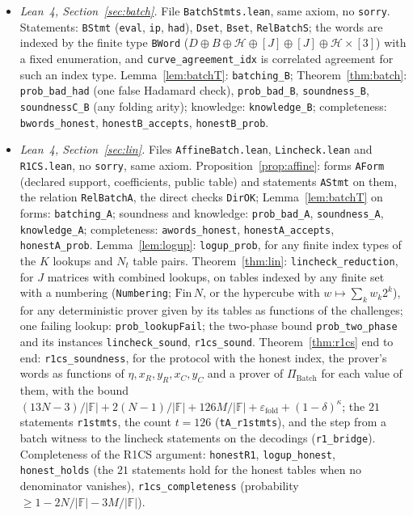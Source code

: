 \documentclass[11pt]{article}
\theoremstyle{definition}
\newcommand{\F}{\mathbb{F}}
\begin{document}
\begin{itemize}[nosep]
\item \emph{Lean~4, Section~\ref{sec:batch}.} File \texttt{BatchStmts.lean}, same axiom, no \texttt{sorry}. Statements: \texttt{BStmt} (\texttt{eval}, \texttt{ip}, \texttt{had}), \texttt{Dset}, \texttt{Bset}, \texttt{RelBatchS}; the words are indexed by the finite type \texttt{BWord} ($D\oplus B\oplus\mathcal H\oplus[J]\oplus[J]\oplus\mathcal H\times[3]$) with a fixed enumeration, and \texttt{curve\_agreement\_idx} is correlated agreement for such an index type. Lemma~\ref{lem:batchT}: \texttt{batching\_B}; Theorem~\ref{thm:batch}: \texttt{prob\_bad\_had} (one false Hadamard check), \texttt{prob\_bad\_B}, \texttt{soundness\_B}, \texttt{soundnessC\_B} (any folding arity); knowledge: \texttt{knowledge\_B}; completeness: \texttt{bwords\_honest}, \texttt{honestB\_accepts}, \texttt{honestB\_prob}.
\item \emph{Lean~4, Section~\ref{sec:lin}.} Files \texttt{AffineBatch.lean}, \texttt{Lincheck.lean} and \texttt{R1CS.lean}, no \texttt{sorry}, same axiom.
Proposition~\ref{prop:affine}: forms \texttt{AForm} (declared support, coefficients, public table) and statements \texttt{AStmt} on them, the relation \texttt{RelBatchA}, the direct checks \texttt{DirOK}; Lemma~\ref{lem:batchT} on forms: \texttt{batching\_A}; soundness and knowledge: \texttt{prob\_bad\_A}, \texttt{soundness\_A}, \texttt{knowledge\_A}; completeness: \texttt{awords\_honest}, \texttt{honestA\_accepts}, \texttt{honestA\_prob}.
Lemma~\ref{lem:logup}: \texttt{logup\_prob}, for any finite index types of the $K$ lookups and $N_t$ table pairs. Theorem~\ref{thm:lin}: \texttt{lincheck\_reduction}, for $J$ matrices with combined lookups, on tables indexed by any finite set with a numbering (\texttt{Numbering}; $\mathrm{Fin}\,N$, or the hypercube with $w\mapsto\sum_k w_k2^k$), for any deterministic prover given by its tables as functions of the challenges; one failing lookup: \texttt{prob\_lookupFail}; the two-phase bound \texttt{prob\_two\_phase} and its instances \texttt{lincheck\_sound}, \texttt{r1cs\_sound}.
Theorem~\ref{thm:r1cs} end to end: \texttt{r1cs\_soundness}, for the protocol with the honest index, the prover's words as functions of $\eta,x_R,y_R,x_C,y_C$ and a prover of $\Pi_{\mathrm{Batch}}$ for each value of them, with the bound $(13N-3)/|\F|+2(N-1)/|\F|+126M/|\F|+\varepsilon_{\mathrm{fold}}+(1-\delta)^\kappa$; the $21$ statements \texttt{r1stmts}, the count $t=126$ (\texttt{tA\_r1stmts}), and the step from a batch witness to the lincheck statements on the decodings (\texttt{r1\_bridge}).
Completeness of the R1CS argument: \texttt{honestR1}, \texttt{logup\_honest}, \texttt{honest\_holds} (the $21$ statements hold for the honest tables when no denominator vanishes), \texttt{r1cs\_completeness} (probability $\ge1-2N/|\F|-3M/|\F|$).

\end{itemize}
\end{document}
